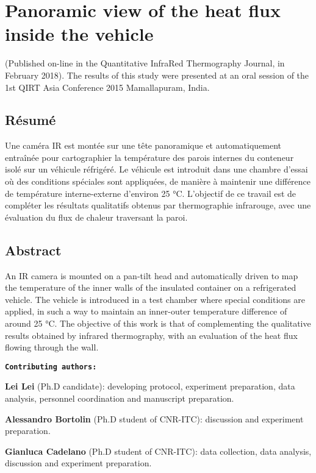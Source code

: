 \chapter{Panoramic view of the heat flux inside the vehicle}     %
(Published on-line  in the Quantitative InfraRed Thermography Journal, in February 2018).
The results of this study were presented at an oral session of the 1st QIRT Asia Conference 2015 Mamallapuram, India. %
\section{Résumé}
Une caméra IR est montée sur une tête panoramique et automatiquement entraînée pour cartographier la température des parois internes du conteneur isolé sur un véhicule réfrigéré. Le véhicule est introduit dans une chambre d'essai où des conditions spéciales sont appliquées, de manière à maintenir une différence de température interne-externe d'environ 25 °C. L'objectif de ce travail est de compléter les résultats qualitatifs obtenus par thermographie infrarouge, avec une évaluation du flux de chaleur traversant la paroi.

\section{Abstract}
An IR camera is mounted on a pan-tilt head and automatically driven to map the temperature of the inner walls of the insulated container on a refrigerated vehicle. The vehicle is introduced in a test chamber where special conditions are applied, in such a way to maintain an inner-outer temperature difference of around 25 °C. The objective of this work is that of complementing the qualitative results obtained by infrared thermography, with an evaluation of the heat flux flowing through the wall.

\textbf{\texttt{Contributing authors:}}

\textbf{\textsf{Lei Lei}} (Ph.D candidate): developing protocol, experiment preparation, data analysis,  personnel coordination and manuscript preparation.

\textbf{Alessandro Bortolin} (Ph.D student of CNR-ITC): discussion and experiment preparation.

\textbf{Gianluca Cadelano} (Ph.D student of CNR-ITC): data collection, data analysis, discussion and experiment preparation.

